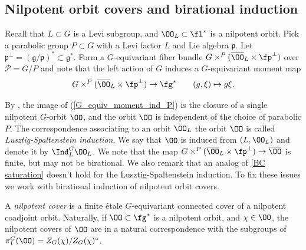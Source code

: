 \documentclass[12pt]{amsart}
\begin{document}

    \subsection{Nilpotent orbit covers and birational induction}\label{sect_nilp_orbits_covers_and_bir_ind}

    Recall that $L\subset G$ is a Levi subgroup, and $\OO_L\subset \fl^*$ is a nilpotent orbit. Pick a parabolic group $P\subset G$ with a Levi factor $L$ and Lie algebra $\mathfrak{p}$. Let $\mathfrak{p}^{\perp}=(\mathfrak{g}/\mathfrak{p})^* \subset \mathfrak{g}^*$. Form a $G$-equivariant fiber bundle $G\times^P (\overline{\OO}_L\times \fp^\perp)$ over $\mathcal{P}=G/P$ and note that the left action of $G$ induces a $G$-equivariant moment map 
    \begin{equation}\label{G_equiv_moment_ind_P}
    G\times^P(\overline{\OO}_L\times \fp^\perp)\to \fg^* \qquad (g, \xi) \mapsto g\xi.
    \end{equation}

    By \cite{LS}, the image of (\ref{G_equiv_moment_ind_P}) is the closure of a single nilpotent $G$-orbit $\OO$, and the orbit $\OO$ is independent of the choice of parabolic $P$. The correspondence associating to an orbit $\OO_L$ the orbit $\OO$ is called \emph{Lusztig-Spaltenstein induction}. We say that $\OO$ is induced from $(L, \OO_L)$ and denote it by $\Ind_L^G \OO_L$. We note that the map $G\times^P(\overline{\OO}_L\times \fp^\perp)\to \overline{\OO}$ is finite, but may not be birational. We also remark that an analog of \cref{BC saturation} doesn't hold for the Lusztig-Spaltenstein induction. To fix these issues we work with birational induction of nilpotent orbit covers.

    A \emph{nilpotent cover} is a finite \'{e}tale $G$-equivariant connected cover of a nilpotent coadjoint orbit. Naturally, if $\OO\subset \fg^*$ is a nilpotent orbit, and $\chi\in \OO$, the nilpotent covers of $\OO$ are in a natural correspondence with the subgroups of $\pi_1^G(\OO)=Z_G(\chi)/Z_G(\chi)^\circ$. 
\end{document}
